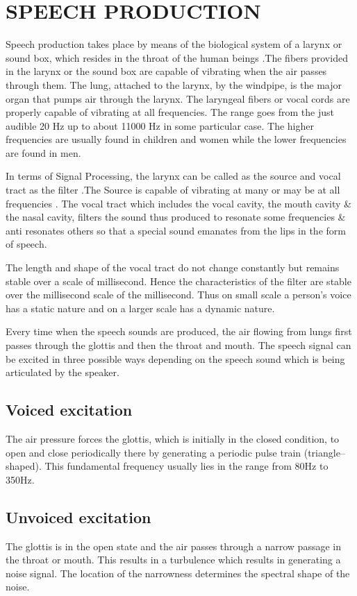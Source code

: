 \documentclass[a4paper,12pt]{report} %
\begin{document}
\section{SPEECH PRODUCTION}
Speech production takes place by means of the biological system of a larynx or sound box, which resides in the throat of the human beings .The fibers provided in the larynx or the sound box are capable of vibrating when the air passes through them. The lung, attached to the larynx, by the windpipe, is the major organ that pumps air through the larynx. The laryngeal fibers or vocal cords are properly capable of vibrating at all frequencies. The range goes from the just audible 20 Hz up to about 11000 Hz in some particular case. The higher frequencies are usually found in children and women while the lower frequencies are found in men.\par 
 In terms of Signal Processing, the larynx can be called as the source and vocal tract as the filter .The Source is capable of vibrating at many or may be at all frequencies . The vocal tract which includes the vocal cavity, the mouth cavity \& the nasal cavity, filters the sound thus produced to resonate some frequencies \& anti resonates others so that a special sound emanates from the lips in the form of speech.\par 
The length and shape of the vocal tract do not change constantly but remains stable over a scale of millisecond. Hence the characteristics of the filter are stable over the millisecond scale of the millisecond. Thus on small scale a person’s voice has a static nature and on a larger scale has a dynamic nature.\par 
Every time when the speech sounds are produced, the air flowing from lungs first passes through the glottis and then the throat and mouth. The speech signal can be excited in three possible ways depending on the speech sound which is being articulated by the speaker.
\subsection{Voiced excitation}
The air pressure forces the glottis, which is initially in the closed condition, to open and close periodically there by generating a periodic pulse train (triangle–shaped). This fundamental frequency usually lies in the range from 80Hz to 350Hz. 
\subsection{Unvoiced excitation}
The glottis is in the open state and the air passes through a narrow passage in the throat or mouth. This results in a turbulence which results in generating a noise signal. The location of the narrowness determines the spectral shape of the noise. 
\end{document}
